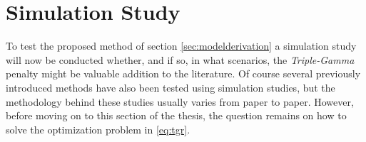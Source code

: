 \documentclass[12pt,a4paper]{article}
\newenvironment{lightbluebox}{%
    \begin{tcolorbox}[colback=lightblue, colframe=lightblue, fontupper=\itshape]%
}{%
    \end{tcolorbox}%
}
\begin{document}




\newpage
\section{Simulation Study}\label{sec:simstudy_overall}
To test the proposed method of section \ref{sec:modelderivation} a simulation study will now be conducted whether, and if so, in what scenarios, the \textit{Triple-Gamma} penalty might be valuable addition to the literature. Of course several previously introduced methods have also been tested using simulation studies, but the methodology behind these studies usually varies from paper to paper. However, before moving on to this section of the thesis, the question remains on how to solve the optimization problem in \ref{eq:tgr}. 
\end{document}
